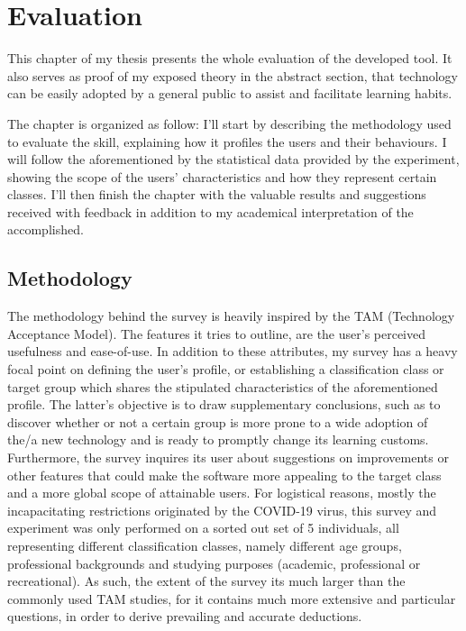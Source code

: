 \chapter{Evaluation}
\label{cha:evaluation}

This chapter of my thesis presents the whole evaluation of the developed tool. It also serves as proof of my exposed theory in the abstract section, that technology can be easily adopted by a general public to assist and facilitate learning habits.

The chapter is organized as follow: I'll start by describing the methodology used to evaluate the skill, explaining how it profiles the users and their behaviours. I will follow the aforementioned by the statistical data provided by the experiment, showing the scope of the users' characteristics and how they represent certain classes. I'll then finish the chapter with the valuable results and suggestions received with feedback in addition to my academical interpretation of the accomplished.


\section{Methodology}

The methodology behind the survey is heavily inspired by the TAM (Technology Acceptance Model). 
The features it tries to outline, are the user's perceived usefulness and ease-of-use. 
In addition to these attributes, my survey has a heavy focal point on defining the user's 
profile, or establishing a classification class or target group which shares the stipulated 
characteristics of the aforementioned profile. The latter's objective is to draw 
supplementary conclusions, such as to discover whether or not a certain group is more prone 
to a wide adoption of the/a new technology and is ready to promptly change its learning customs.
Furthermore, the survey inquires its user about suggestions on improvements or other features 
that could make the software more appealing to the target class and a more global scope of 
attainable users. For logistical reasons, mostly the incapacitating restrictions originated 
by the COVID-19 virus, this survey and experiment was only performed on a sorted out set 
of 5 individuals, all representing different classification classes, namely different age 
groups, professional backgrounds and studying purposes (academic, professional or recreational).
As such, the extent of the survey its much larger than the commonly used TAM studies, 
for it contains much more extensive and particular questions, in order to derive prevailing 
and accurate deductions.


